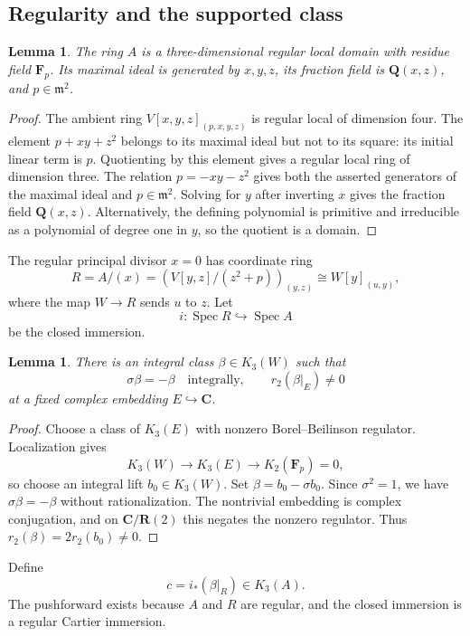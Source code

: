\documentclass[11pt,a4paper]{amsart}
\numberwithin{equation}{section}
\newtheorem{lemma}[theorem]{Lemma}
\theoremstyle{definition}
\theoremstyle{remark}
\newcommand{\Q}{\mathbf Q}
\newcommand{\R}{\mathbf R}
\newcommand{\C}{\mathbf C}
\newcommand{\F}{\mathbf F}
\newcommand{\m}{\mathfrak m}
\newcommand{\Spec}{\operatorname{Spec}}
\begin{document}
\subsection{Regularity and the supported class}

\begin{lemma}\label{d3:lem:regularA}
The ring $A$ is a three-dimensional regular local domain with residue field $\F_p$. Its maximal ideal is generated by $x,y,z$, its fraction field is $\Q(x,z)$, and $p\in\m^2$.
\end{lemma}
\begin{proof}
The ambient ring $V[x,y,z]_{(p,x,y,z)}$ is regular local of dimension four. The element $p+xy+z^2$ belongs to its maximal ideal but not to its square: its initial linear term is $p$. Quotienting by this element gives a regular local ring of dimension three. The relation $p=-xy-z^2$ gives both the asserted generators of the maximal ideal and $p\in\m^2$. Solving for $y$ after inverting $x$ gives the fraction field $\Q(x,z)$. Alternatively, the defining polynomial is primitive and irreducible as a polynomial of degree one in $y$, so the quotient is a domain.
\end{proof}

The regular principal divisor $x=0$ has coordinate ring
\[
R=A/(x)=\left(V[y,z]/(z^2+p)\right)_{(y,z)}
\cong W[y]_{(u,y)},
\]
where the map $W\to R$ sends $u$ to $z$. Let
\[
i:\Spec R\hookrightarrow\Spec A
\]
be the closed immersion.

\begin{lemma}\label{d3:lem:beta}
There is an integral class $\beta\in K_3(W)$ such that
\[
\sigma\beta=-\beta\quad\text{integrally},\qquad r_2(\beta|_E)\neq 0
\]
at a fixed complex embedding $E\hookrightarrow\C$.
\end{lemma}
\begin{proof}
Choose a class of $K_3(E)$ with nonzero Borel--Beilinson regulator. Localization gives
\[
K_3(W)\longrightarrow K_3(E)\longrightarrow K_2(\F_p)=0,
\]
so choose an integral lift $b_0\in K_3(W)$. Set $\beta=b_0-\sigma b_0$. Since $\sigma^2=1$, we have $\sigma\beta=-\beta$ without rationalization. The nontrivial embedding is complex conjugation, and on $\C/\R(2)$ this negates the nonzero regulator. Thus $r_2(\beta)=2r_2(b_0)\neq 0$.
\end{proof}

Define
\begin{equation}\label{d3:eq:c}
c=i_*(\beta|_R)\in K_3(A).
\end{equation}
The pushforward exists because $A$ and $R$ are regular, and the closed immersion is a regular Cartier immersion.
\end{document}
